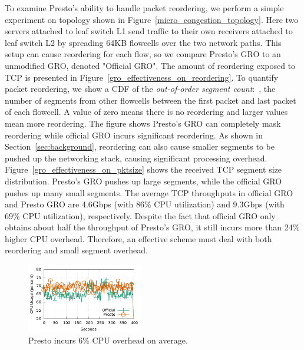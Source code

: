 To examine Presto's ability to handle packet reordering, we perform a simple experiment
on topology shown in Figure~\ref{micro_congestion_topology}.
Here two servers attached to leaf switch L1 
send traffic to their own receivers attached to leaf switch L2
by spreading 64KB flowcells over the two network paths. 
This setup can cause reordering for each flow, so 
we compare Presto's GRO to
an unmodified GRO, denoted "Official GRO". 
The amount of reordering exposed to TCP is presented in Figure~\ref{gro_effectiveness_on_reordering}.
To quantify packet reordering, we show a CDF of the {\em out-of-order segment count}:~\ie{},
the number of segments from other flowcells between the first packet and last packet of each flowcell. A value of zero
means there is no reordering and larger values mean more reordering. The figure shows Presto's GRO can completely mask reordering
while official GRO incurs significant reordering. As shown in Section~\ref{sec:background}, reordering can
also cause smaller segments to be pushed up the networking stack, causing significant processing overhead.
Figure~\ref{gro_effectiveness_on_pktsize} shows the received TCP segment size distribution.  Presto's GRO
pushes up large segments, while the official GRO pushes up many small segments.
The average TCP throughputs in official GRO and Presto GRO are 4.6Gbps (with 86\% CPU utilization) and 
9.3Gbps (with 69\% CPU utilization), respectively. Despite the fact that official GRO only obtains 
about half the throughput of Presto's GRO, it still incurs more than 24\% higher CPU overhead. 
Therefore, an effective scheme must deal with both reordering and small segment overhead.

\begin{figure}[t]
        \centering
  \includegraphics[width=0.45\textwidth]{presto/figures/mornitor_cpu/macro_compare_cpu_usage.pdf}
        \caption{Presto incurs 6\% CPU overhead on average.}
        \label{micro_compare_cpu}
\end{figure}

